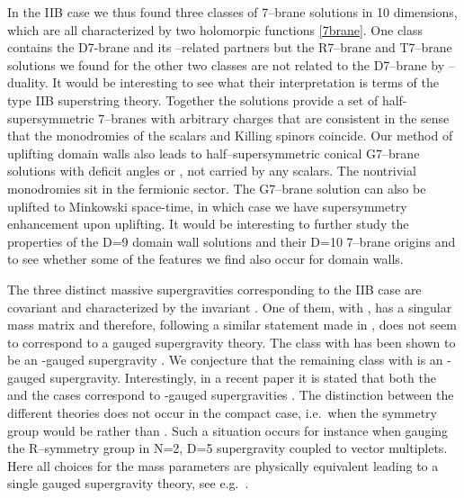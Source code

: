 \documentclass[12pt,a4paper]{article}
\def\bb#1{\hbox{\mybb#1}}
\begin{document}
In the IIB case we thus found three classes of 7--brane solutions in 10
dimensions, which are all characterized by two holomorpic functions
\eqref{7brane}. One class contains the D7-brane and its \myHighlight{$SL(2,\bb{R})$}\coordHE{}--related
partners but the R7--brane and T7--brane solutions we found for the
other two classes are not related to the
D7--brane by \myHighlight{$SL(2,\bb{R})$}\coordHE{}--duality. It would be interesting to
see what their interpretation is terms of the type IIB superstring theory.
Together the solutions provide a set of half-supersymmetric
7--branes with arbitrary charges that are consistent in the sense that
the monodromies of the scalars and Killing spinors coincide.
Our method of uplifting domain walls also leads to half--supersymmetric 
conical G7--brane solutions
with deficit angles \coordHE{} or \coordHE{}, not carried by any scalars.
The nontrivial monodromies sit in the fermionic sector. The G7--brane 
solution can also be uplifted to Minkowski space-time, in which case we
have supersymmetry enhancement upon uplifting.
It would be interesting to further study the properties of
the D=9 domain wall solutions and their D=10 7--brane origins and to see
whether some of the features we find also occur for \coordHE{} domain walls.

The three distinct massive supergravities corresponding to the IIB case are
\myHighlight{$SL(2,\bb{R})$}\coordHE{} covariant and characterized by the \myHighlight{$SL(2,\bb{R})$}\coordHE{}
invariant \coordHE{}. One of them, with \coordHE{}, has a singular
mass matrix and therefore, following a similar statement made in
\cite{Alonso-Alberca:2000gh}, does not seem to correspond to a gauged
supergravity theory.
The class with \coordHE{} has been shown to be an
\coordHE{}-gauged supergravity \cite{Cowdall:2000sq}. We conjecture
that the remaining class with \coordHE{} is an \coordHE{}-gauged
supergravity. Interestingly, in a recent paper it is stated that both
the \coordHE{} and the \coordHE{} cases correspond to
\coordHE{}-gauged supergravities \cite{Hull:2002wg}.
The distinction between the different theories does not occur in the
compact case,
i.e.~when the symmetry group would be \coordHE{} rather than \myHighlight{$SL(2,\bb{R})$}\coordHE{}.
Such a situation occurs for instance when gauging the \coordHE{}
R--symmetry group in N=2, D=5 supergravity coupled to vector
multiplets. Here all choices for the mass parameters are physically
equivalent leading to a single gauged supergravity theory,
see e.g.~\cite{Bergshoeff:2000zn}.
\end{document}
